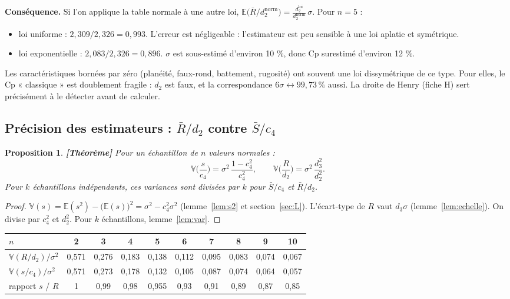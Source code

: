 \documentclass[11pt,a4paper]{article}
\theoremstyle{tq}
\newtheorem{prop}{Proposition}
\theoremstyle{remark}
\newcommand{\thm}{\textcolor{vertTQ}{\textbf{[Théorème]}}}
\newcommand{\E}{\mathbb{E}}
\newcommand{\V}{\mathbb{V}}
\newcommand{\Rb}{\bar{R}}
\begin{document}
\textbf{Conséquence.} Si l'on applique la table normale à une autre loi, $\E\big(\Rb/d_2^{\text{norm}}\big)=\frac{d_2^{\text{loi}}}{d_2^{\text{norm}}}\,\sigma$. Pour $n=5$ :
\begin{itemize}[nosep,leftmargin=1.2em]
\item loi uniforme : $2{,}309/2{,}326=0{,}993$. L'erreur est négligeable : l'estimateur est peu sensible à une loi aplatie et symétrique.
\item loi exponentielle : $2{,}083/2{,}326=0{,}896$. $\sigma$ est sous-estimé d'environ 10 \%, donc Cp surestimé d'environ 12 \%.
\end{itemize}
Les caractéristiques bornées par zéro (planéité, faux-rond, battement, rugosité) ont souvent une loi dissymétrique de ce type. Pour elles, le Cp « classique » est doublement fragile : $d_2$ est faux, et la correspondance $6\sigma\leftrightarrow99{,}73\,\%$ aussi. La droite de Henry (fiche H) sert précisément à le détecter avant de calculer.

\subsection{Précision des estimateurs : $\Rb/d_2$ contre $\bar S/c_4$}\label{sec:efficacite}
\begin{prop}\thm{}
Pour un échantillon de $n$ valeurs normales :
\[
\V\Big(\frac{s}{c_4}\Big)=\sigma^2\,\frac{1-c_4^2}{c_4^2},\qquad \V\Big(\frac{R}{d_2}\Big)=\sigma^2\,\frac{d_3^2}{d_2^2}.
\]
Pour $k$ échantillons indépendants, ces variances sont divisées par $k$ pour $\bar S/c_4$ et $\Rb/d_2$.
\end{prop}
\begin{proof}
$\V(s)=\E(s^2)-\big(\E(s)\big)^2=\sigma^2-c_4^2\sigma^2$ (lemme~\ref{lem:s2} et section~\ref{sec:L}). L'écart-type de $R$ vaut $d_3\sigma$ (lemme~\ref{lem:echelle}). On divise par $c_4^2$ et $d_2^2$. Pour $k$ échantillons, lemme~\ref{lem:var}.
\end{proof}

\begin{center}\small
\begin{tabular}{@{}lccccccccc@{}}
\toprule
$n$ & 2 & 3 & 4 & 5 & 6 & 7 & 8 & 9 & 10\\
\midrule
$\V(R/d_2)/\sigma^2$ & 0,571 & 0,276 & 0,183 & 0,138 & 0,112 & 0,095 & 0,083 & 0,074 & 0,067\\
$\V(s/c_4)/\sigma^2$ & 0,571 & 0,273 & 0,178 & 0,132 & 0,105 & 0,087 & 0,074 & 0,064 & 0,057\\
rapport $s$ / $R$ & 1 & 0,99 & 0,98 & 0,955 & 0,93 & 0,91 & 0,89 & 0,87 & 0,85\\
\bottomrule
\end{tabular}
\end{center}
\end{document}
